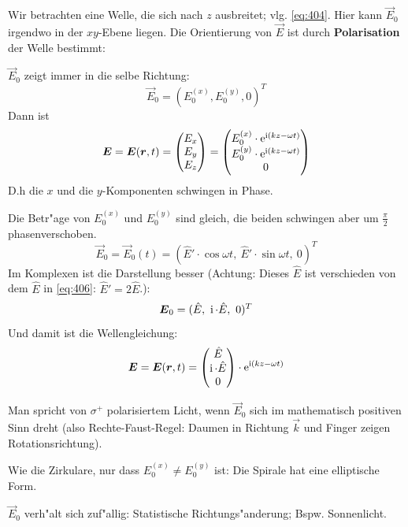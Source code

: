 Wir betrachten eine Welle, die sich nach $z$ ausbreitet;
vlg. \eqref{eq:404}. Hier kann $\vec E_0$ irgendwo in der $xy$-Ebene
liegen. Die Orientierung von $\vec E$ ist durch \textbf{Polarisation}
der Welle bestimmt:
\begin{description}[\setlabelstyle{\bfseries\slshape}]
\item[\index{Lineare Polarisation}Lineare \index{Polarisation}Polarisation]
$\vec E_0$ zeigt immer in die selbe Richtung:
\begin{equation}
\label{eq:405}
   \vec E_0 = (E_0^{(x)}, E_0^{(y)}, 0)^T
\end{equation}
Dann ist
\begin{equation*}
   \boldsymbol{E} = \boldsymbol{E}(\boldsymbol{r},t) =
   \begin{pmatrix}
      E_x\\E_y\\E_z
   \end{pmatrix}
=
\begin{pmatrix}
   E_0^{(x)} \cdot \operatorname{e}^{\operatorname{i} (k z - \omega t)}\\
   E_0^{(y)} \cdot \operatorname{e}^{\operatorname{i} (k z - \omega t)}\\
0
\end{pmatrix}
\end{equation*}
D.h die $x$ und die $y$-Komponenten schwingen in Phase.
\item[\index{Zirkulare Polarisation}Zirkulare Polarisation]
Die Betr"age von $E_0^{(x)}$ und $E_0^{(y)}$ sind gleich, die beiden
schwingen aber um $\frac{\pi}{2}$ phasenverschoben.
\begin{equation}
   \label{eq:406}
   \vec E_0 = \vec E_0(t) = (\hat E' \cdot \cos \omega t, ~ \hat E' \cdot \sin \omega
   t, ~ 0) ^T
\end{equation}
Im Komplexen ist die Darstellung besser (Achtung: Dieses $\hat E$ ist
verschieden von dem $\hat E$ in \eqref{eq:406}: $\hat E' = 2 \hat E$.):
\begin{equation}
   \label{eq:407}
   \boldsymbol{E}_0 = (\hat E,~ \operatorname{i} \cdot \hat E,~ 0)^T
\end{equation}
Und damit ist die Wellengleichung:
\begin{equation*}
   \boldsymbol{E} = \boldsymbol{E}(\boldsymbol{r},t) =
   \begin{pmatrix}
      \hat E\\\operatorname{i} \cdot \hat E\\ 0
   \end{pmatrix} \cdot \operatorname{e}^{\operatorname{i} (kz  - \omega t)}
\end{equation*}

Man spricht von $\sigma^+$ polarisiertem Licht, wenn $\vec E_0$ sich
im mathematisch positiven Sinn dreht (also Rechte-Faust-Regel: Daumen
in Richtung $\vec k$ und Finger zeigen Rotationsrichtung).

\item[\index{Elliptische Polarisation}Elliptische Polarisation]
Wie die Zirkulare, nur dass $E_0^{(x)} \neq E_0^{(y)}$ ist: Die
Spirale hat eine elliptische Form.


\item[unolarisierte Welle]
$\vec E_0$ verh"alt sich zuf"allig: Statistische Richtungs"anderung;
Bspw. Sonnenlicht.
\end{description}

